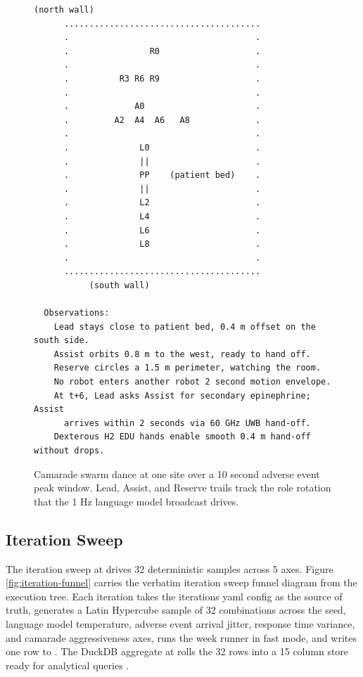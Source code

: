 \begin{sectionaccent}
\begin{figure}[H]
\begin{Verbatim}[fontsize=\footnotesize]
           (north wall)
      .......................................
      .                                     .
      .                R0                   .
      .                                     .
      .          R3 R6 R9                   .
      .                                     .
      .             A0                      .
      .         A2  A4  A6   A8             .
      .                                     .
      .              L0                     .
      .              ||                     .
      .              PP    (patient bed)    .
      .              ||                     .
      .              L2                     .
      .              L4                     .
      .              L6                     .
      .              L8                     .
      .                                     .
      .......................................
           (south wall)

  Observations:
    Lead stays close to patient bed, 0.4 m offset on the south side.
    Assist orbits 0.8 m to the west, ready to hand off.
    Reserve circles a 1.5 m perimeter, watching the room.
    No robot enters another robot 2 second motion envelope.
    At t+6, Lead asks Assist for secondary epinephrine; Assist
      arrives within 2 seconds via 60 GHz UWB hand-off.
    Dexterous H2 EDU hands enable smooth 0.4 m hand-off without drops.
\end{Verbatim}
\caption{Camarade swarm dance at one site over a 10 second adverse event peak window. Lead, Assist, and Reserve trails track the role rotation that the 1 Hz language model broadcast drives.}
\label{fig:swarm-dance}
\end{figure}

\subsection{Iteration Sweep}
\label{sec:methods-iterations}

The iteration sweep at  drives 32
deterministic samples across 5 axes. Figure
\ref{fig:iteration-funnel} carries the verbatim iteration sweep
funnel diagram from the execution tree. Each iteration takes the
iterations yaml config as the source of truth, generates a Latin
Hypercube sample of 32 combinations across the seed, language model
temperature, adverse event arrival jitter, response time variance,
and camarade aggressiveness axes, runs the week runner in fast mode,
and writes one row to .
The DuckDB aggregate at
 rolls the 32
rows into a 15 column store ready for analytical queries
\cite{duckdb_2026, apache_arrow_2026}.


\end{sectionaccent}

